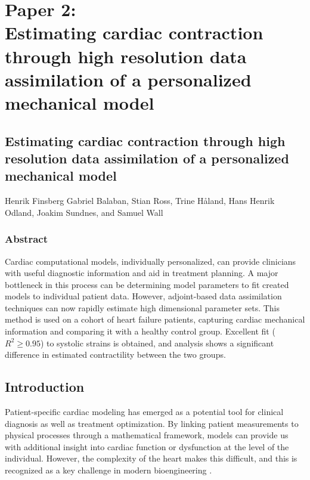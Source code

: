  
\graphicspath{{chapters/paper2/figures/}}


\chapter{Paper 2: \\Estimating cardiac contraction through high resolution data
  assimilation of a personalized mechanical model}

\clearpage

\section*{Estimating cardiac contraction through high resolution data
  assimilation of a personalized mechanical model}

\begin{center}
  Henrik Finsberg
  Gabriel Balaban,
  Stian Ross,
  Trine H\r{a}land,
  Hans Henrik Odland, 
  Joakim Sundnes, and
  Samuel Wall
\end{center}

 
\subsection*{Abstract}
  
Cardiac computational models, individually personalized, can provide
clinicians with useful diagnostic information and aid in
treatment planning.  A major bottleneck in this process can be  
determining model parameters to fit created models to individual
patient data. However, adjoint-based data assimilation techniques can
now rapidly estimate high dimensional parameter sets.  This method is
used on a cohort of heart failure patients, capturing cardiac mechanical
information and comparing it with a healthy control group.  Excellent
fit ($R^2 \geq 0.95$) to systolic strains is obtained, and analysis
shows a significant difference in estimated contractility between the
two groups.


\clearpage
\section{Introduction}
\label{sec:introduction}

Patient-specific cardiac modeling has emerged as a potential tool
for clinical diagnosis as well as treatment
 optimization\cite{viceconti2016virtual}.  By linking
patient measurements to physical processes through a mathematical
framework, models can provide us with additional insight into
cardiac function or dysfunction at the level of the
individual. However, the complexity of the heart makes this difficult,
and this is recognized as a key challenge in modern bioengineering
\cite{hunter2010vision}. 

